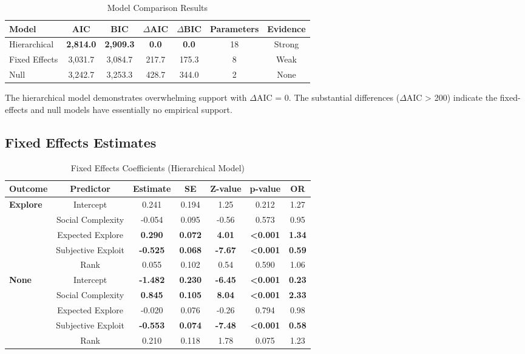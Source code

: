 \documentclass[11pt]{article}
\begin{document}
\begin{table}[H]
\centering
\caption{Model Comparison Results}
\begin{tabular}{lcccccc}
\toprule
\textbf{Model} & \textbf{AIC} & \textbf{BIC} & \textbf{$\Delta$AIC} & \textbf{$\Delta$BIC} & \textbf{Parameters} & \textbf{Evidence} \\
\midrule
Hierarchical & \textbf{2,814.0} & \textbf{2,909.3} & \textbf{0.0} & \textbf{0.0} & 18 & Strong \\
Fixed Effects & 3,031.7 & 3,084.7 & 217.7 & 175.3 & 8 & Weak \\
Null & 3,242.7 & 3,253.3 & 428.7 & 344.0 & 2 & None \\
\bottomrule
\end{tabular}
\label{tab:model_comparison}
\end{table}

The hierarchical model demonstrates overwhelming support with $\Delta$AIC = 0. The substantial differences ($\Delta$AIC > 200) indicate the fixed-effects and null models have essentially no empirical support.

\subsection{Fixed Effects Estimates}

\begin{table}[H]
\centering
\caption{Fixed Effects Coefficients (Hierarchical Model)}
\begin{tabular}{lcccccc}
\toprule
\textbf{Outcome} & \textbf{Predictor} & \textbf{Estimate} & \textbf{SE} & \textbf{Z-value} & \textbf{p-value} & \textbf{OR} \\
\midrule
\multirow{5}{*}{\textbf{Explore}} 
& Intercept & 0.241 & 0.194 & 1.25 & 0.212 & 1.27 \\
& Social Complexity & -0.054 & 0.095 & -0.56 & 0.573 & 0.95 \\
& Expected Explore & \textbf{0.290} & \textbf{0.072} & \textbf{4.01} & \textbf{<0.001} & \textbf{1.34} \\
& Subjective Exploit & \textbf{-0.525} & \textbf{0.068} & \textbf{-7.67} & \textbf{<0.001} & \textbf{0.59} \\
& Rank & 0.055 & 0.102 & 0.54 & 0.590 & 1.06 \\
\midrule
\multirow{5}{*}{\textbf{None}} 
& Intercept & \textbf{-1.482} & \textbf{0.230} & \textbf{-6.45} & \textbf{<0.001} & \textbf{0.23} \\
& Social Complexity & \textbf{0.845} & \textbf{0.105} & \textbf{8.04} & \textbf{<0.001} & \textbf{2.33} \\
& Expected Explore & -0.020 & 0.076 & -0.26 & 0.794 & 0.98 \\
& Subjective Exploit & \textbf{-0.553} & \textbf{0.074} & \textbf{-7.48} & \textbf{<0.001} & \textbf{0.58} \\
& Rank & 0.210 & 0.118 & 1.78 & 0.075 & 1.23 \\
\bottomrule
\end{tabular}
\label{tab:fixed_effects}
\end{table}
\end{document}
